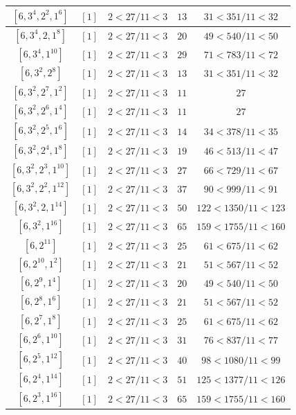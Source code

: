 \documentclass{article}%
\begin{document}
\begin{center}
\begin{longtable}{||c|c|c|c|c||}
$[6, 3^{4}, 2^{2}, 1^{6}]$ & $[1]$ & $2 < 27/11 < 3$ & $13$ & $31 < 351/11 < 32$ \\ \hline 
$[6, 3^{4}, 2, 1^{8}]$ & $[1]$ & $2 < 27/11 < 3$ & $20$ & $49 < 540/11 < 50$ \\ \hline 
$[6, 3^{4}, 1^{10}]$ & $[1]$ & $2 < 27/11 < 3$ & $29$ & $71 < 783/11 < 72$ \\ \hline 
$[6, 3^{2}, 2^{8}]$ & $[1]$ & $2 < 27/11 < 3$ & $13$ & $31 < 351/11 < 32$ \\ \hline 
$[6, 3^{2}, 2^{7}, 1^{2}]$ & $[1]$ & $2 < 27/11 < 3$ & $11$ & $27$ \\ \hline 
$[6, 3^{2}, 2^{6}, 1^{4}]$ & $[1]$ & $2 < 27/11 < 3$ & $11$ & $27$ \\ \hline 
$[6, 3^{2}, 2^{5}, 1^{6}]$ & $[1]$ & $2 < 27/11 < 3$ & $14$ & $34 < 378/11 < 35$ \\ \hline 
$[6, 3^{2}, 2^{4}, 1^{8}]$ & $[1]$ & $2 < 27/11 < 3$ & $19$ & $46 < 513/11 < 47$ \\ \hline 
$[6, 3^{2}, 2^{3}, 1^{10}]$ & $[1]$ & $2 < 27/11 < 3$ & $27$ & $66 < 729/11 < 67$ \\ \hline 
$[6, 3^{2}, 2^{2}, 1^{12}]$ & $[1]$ & $2 < 27/11 < 3$ & $37$ & $90 < 999/11 < 91$ \\ \hline 
$[6, 3^{2}, 2, 1^{14}]$ & $[1]$ & $2 < 27/11 < 3$ & $50$ & $122 < 1350/11 < 123$ \\ \hline 
$[6, 3^{2}, 1^{16}]$ & $[1]$ & $2 < 27/11 < 3$ & $65$ & $159 < 1755/11 < 160$ \\ \hline 
$[6, 2^{11}]$ & $[1]$ & $2 < 27/11 < 3$ & $25$ & $61 < 675/11 < 62$ \\ \hline 
$[6, 2^{10}, 1^{2}]$ & $[1]$ & $2 < 27/11 < 3$ & $21$ & $51 < 567/11 < 52$ \\ \hline 
$[6, 2^{9}, 1^{4}]$ & $[1]$ & $2 < 27/11 < 3$ & $20$ & $49 < 540/11 < 50$ \\ \hline 
$[6, 2^{8}, 1^{6}]$ & $[1]$ & $2 < 27/11 < 3$ & $21$ & $51 < 567/11 < 52$ \\ \hline 
$[6, 2^{7}, 1^{8}]$ & $[1]$ & $2 < 27/11 < 3$ & $25$ & $61 < 675/11 < 62$ \\ \hline 
$[6, 2^{6}, 1^{10}]$ & $[1]$ & $2 < 27/11 < 3$ & $31$ & $76 < 837/11 < 77$ \\ \hline 
$[6, 2^{5}, 1^{12}]$ & $[1]$ & $2 < 27/11 < 3$ & $40$ & $98 < 1080/11 < 99$ \\ \hline 
$[6, 2^{4}, 1^{14}]$ & $[1]$ & $2 < 27/11 < 3$ & $51$ & $125 < 1377/11 < 126$ \\ \hline 
$[6, 2^{3}, 1^{16}]$ & $[1]$ & $2 < 27/11 < 3$ & $65$ & $159 < 1755/11 < 160$ \\ \hline 

\end{longtable}
\end{center}
\end{document}
